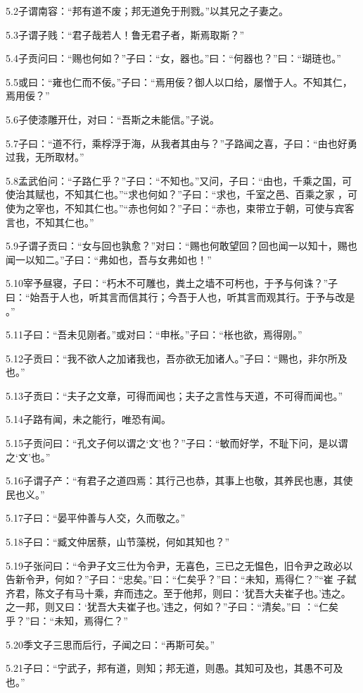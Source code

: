 \documentclass[a4paper,12pt,UTF8,twoside]{ctexbook}
\begin{document}
5.2子谓南容：“邦有道不废；邦无道免于刑戮。”以其兄之子妻之。

5.3子谓子贱：“君子哉若人！鲁无君子者，斯焉取斯？”

5.4子贡问曰：“赐也何如？”子曰：“女，器也。”曰：“何器也？”曰：“瑚琏也。”

5.5或曰：“雍也仁而不佞。”子曰：“焉用佞？御人以口给，屡憎于人。不知其仁，焉用佞？”

5.6子使漆雕开仕，对曰：“吾斯之未能信。”子说。

5.7子曰：“道不行，乘桴浮于海，从我者其由与？”子路闻之喜，子曰：“由也好勇过我，无所取材。”

5.8孟武伯问：“子路仁乎？”子曰：“不知也。”又问，子曰：“由也，千乘之国，可使治其赋也，不知其仁也。”“求也何如？”子曰：“求也，千室之邑、百乘之家
，可使为之宰也，不知其仁也。”“赤也何如？”子曰：“赤也，束带立于朝，可使与宾客言也，不知其仁也。”

5.9子谓子贡曰：“女与回也孰愈？”对曰：“赐也何敢望回？回也闻一以知十，赐也闻一以知二。”子曰：“弗如也，吾与女弗如也！”

5.10宰予昼寝，子曰：“朽木不可雕也，粪土之墙不可杇也，于予与何诛？”子曰：“始吾于人也，听其言而信其行；今吾于人也，听其言而观其行。于予与改是
。”

5.11子曰：“吾未见刚者。”或对曰：“申枨。”子曰：“枨也欲，焉得刚。”

5.12子贡曰：“我不欲人之加诸我也，吾亦欲无加诸人。”子曰：“赐也，非尔所及也。”

5.13子贡曰：“夫子之文章，可得而闻也；夫子之言性与天道，不可得而闻也。”

5.14子路有闻，未之能行，唯恐有闻。

5.15子贡问曰：“孔文子何以谓之‘文’也？”子曰：“敏而好学，不耻下问，是以谓之‘文’也。”

5.16子谓子产：“有君子之道四焉：其行己也恭，其事上也敬，其养民也惠，其使民也义。”

5.17子曰：“晏平仲善与人交，久而敬之。”

5.18子曰：“臧文仲居蔡，山节藻棁，何如其知也？”

5.19子张问曰：“令尹子文三仕为令尹，无喜色，三已之无愠色，旧令尹之政必以告新令尹，何如？”子曰：“忠矣。”曰：“仁矣乎？”曰：“未知，焉得仁？”“崔
子弑齐君，陈文子有马十乘，弃而违之。至于他邦，则曰：‘犹吾大夫崔子也。’违之。之一邦，则又曰：‘犹吾大夫崔子也。’违之，何如？”子曰：“清矣。”曰
：“仁矣乎？”曰：“未知，焉得仁？”

5.20季文子三思而后行，子闻之曰：“再斯可矣。”

5.21子曰：“宁武子，邦有道，则知；邦无道，则愚。其知可及也，其愚不可及也。”
\end{document}
